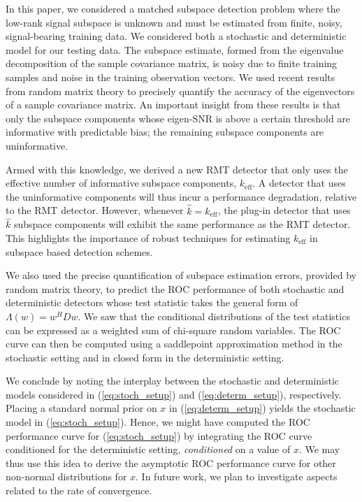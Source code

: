 In this paper, we considered a matched subspace detection problem where the low-rank signal subspace is unknown and must be estimated from finite, noisy, signal-bearing training data. We considered both a stochastic and deterministic model for our testing data. The subspace estimate, formed from the eigenvalue decomposition of the sample covariance matrix, is noisy due to finite training samples and noise in the training observation vectors. We used recent results from random matrix theory to precisely quantify the accuracy of the eigenvectors of a sample covariance matrix. An important insight from these results is that only the subspace components whose eigen-SNR is above a certain threshold are informative \cite{nadakuditi2008sample} with predictable bias; the remaining subspace components are uninformative.

Armed with this knowledge, we derived a new RMT detector that only uses the effective number of informative subspace components, $k_\text{eff}$. A detector that uses the uninformative components will thus incur a performance degradation, relative to the RMT detector. However, whenever $\widehat{k}=k_\text{eff}$, the plug-in detector that uses $\widehat{k}$ subspace components will exhibit the same performance as the RMT detector. This highlights the importance of robust techniques \cite{nadakuditi2010fundamental,johnstone2001distribution,el2007tracy} for estimating $k_\text{eff}$ in subspace based detection schemes.

We also used the precise quantification of subspace estimation errors, provided by random matrix theory, to predict the ROC performance of both stochastic and deterministic detectors whose test statistic takes the general form of $\Lambda(w)=w^HDw$. We saw that the conditional distributions of the test statistics can be expressed as a weighted sum of chi-square random variables. The ROC curve can then be computed using a saddlepoint approximation method in the stochastic setting and in closed form in the deterministic setting.

We conclude by noting the interplay between the stochastic and deterministic models considered in (\ref{eq:stoch_setup}) and (\ref{eq:determ_setup}), respectively. Placing a standard normal prior on $x$ in (\ref{eq:determ_setup}) yields the stochastic model in (\ref{eq:stoch_setup}). Hence, we might have computed the ROC performance curve for (\ref{eq:stoch_setup}) by integrating the ROC curve conditioned for the deterministic setting, \textit{conditioned} on a value of $x$. We may thus use this idea to derive the asymptotic ROC performance curve for other non-normal distributions for $x$. In future work, we plan to investigate aspects related to the rate of convergence.

